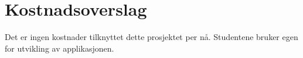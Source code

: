 \section{Kostnadsoverslag}
Det er ingen kostnader tilknyttet dette prosjektet per nå. Studentene bruker egen for utvikling av applikasjonen.
